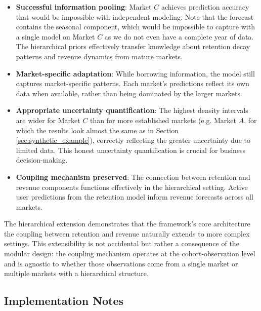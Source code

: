 \documentclass[11pt]{amsart}
\theoremstyle{definition}
\begin{document}
\begin{itemize}
    \item \textbf{Successful information pooling}: Market $C$ achieves prediction accuracy that would be impossible with
          independent modeling. Note that the forecast contains the seasonal component, which would be impossible to capture
          with a single model on Market $C$ as we do not even have a complete year of data.
          The hierarchical priors effectively transfer knowledge about retention decay patterns and revenue
          dynamics from mature markets.

    \item \textbf{Market-specific adaptation}: While borrowing information, the model still captures market-specific patterns.
          Each market's predictions reflect its own data when available, rather than being dominated by the larger markets.

    \item \textbf{Appropriate uncertainty quantification}: The highest density intervals are wider for Market $C$ than for more
          established markets (e.g. Market $A$, for which the results look almost the same as in Section \ref{sec:synthetic_example}),
          correctly reflecting the greater uncertainty due to limited data. This honest uncertainty quantification is crucial
          for business decision-making.

    \item \textbf{Coupling mechanism preserved}: The connection between retention and revenue components functions effectively in
          the hierarchical setting. Active user predictions from the retention model inform revenue forecasts across all markets.
\end{itemize}

The hierarchical extension demonstrates that the framework's core architecture the coupling between retention and revenue 
naturally extends to more complex settings. This extensibility is not accidental but rather a consequence of the modular
design: the coupling mechanism operates at the cohort-observation level and is agnostic to whether those observations come from
a single market or multiple markets with a hierarchical structure.

\subsection{Implementation Notes}
\end{document}
